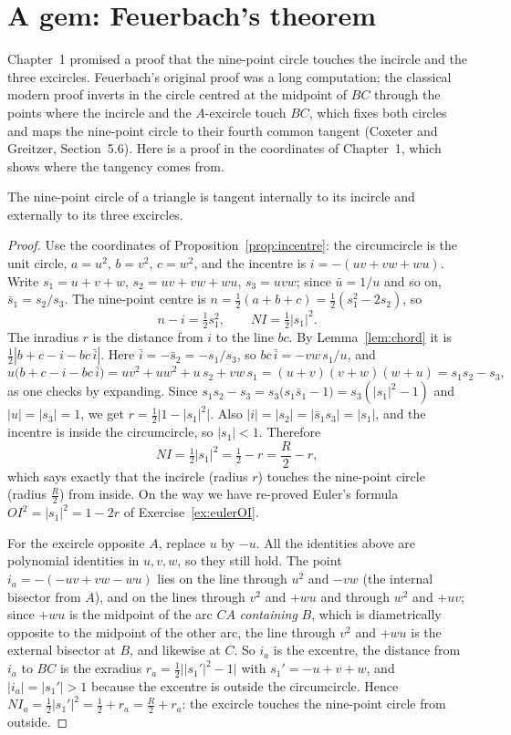 \section{A gem: Feuerbach's theorem}

Chapter~1 promised a proof that the nine-point circle touches the incircle and the three excircles. Feuerbach's original proof was a long
computation; the classical modern proof inverts in the circle centred at the midpoint of $BC$ through the points where the incircle and the
$A$-excircle touch $BC$, which fixes both circles and maps the nine-point circle to their fourth common tangent (Coxeter and Greitzer,
Section~5.6). Here is a proof in the coordinates of Chapter~1, which shows where the tangency comes from.

\begin{theorem}[Feuerbach, 1822]\label{thm:feuerbach}
The nine-point circle of a triangle is tangent internally to its incircle and externally to its three excircles.
\end{theorem}
\begin{proof}
Use the coordinates of Proposition~\ref{prop:incentre}: the circumcircle is the unit circle, $a=u^2$, $b=v^2$, $c=w^2$, and the incentre is
$i=-(uv+vw+wu)$. Write $s_1=u+v+w$, $s_2=uv+vw+wu$, $s_3=uvw$; since $\bar u=1/u$ and so on, $\bar s_1=s_2/s_3$. The nine-point centre is
$n=\frac12(a+b+c)=\frac12(s_1^2-2s_2)$, so
\[
n-i=\tfrac12s_1^2,\qquad NI=\tfrac12|s_1|^2 .
\]
The inradius $r$ is the distance from $i$ to the line $bc$. By Lemma~\ref{lem:chord} it is $\frac12|b+c-i-bc\,\bar i|$. Here
$\bar i=-\bar s_2=-s_1/s_3$, so $bc\,\bar i=-vw\,s_1/u$, and
\[
u\bigl(b+c-i-bc\,\bar i\bigr)=u v^2+uw^2+u\,s_2+vw\,s_1=(u+v)(v+w)(w+u)=s_1s_2-s_3,
\]
as one checks by expanding. Since $s_1s_2-s_3=s_3\bigl(s_1\bar s_1-1\bigr)=s_3(|s_1|^2-1)$ and $|u|=|s_3|=1$, we get $r=\frac12\bigl|1-|s_1|^2\bigr|$.
Also $|i|=|s_2|=|\bar s_1s_3|=|s_1|$, and the incentre is inside the circumcircle, so $|s_1|<1$. Therefore
\[
NI=\tfrac12|s_1|^2=\tfrac12-r=\frac R2-r ,
\]
which says exactly that the incircle (radius $r$) touches the nine-point circle (radius $\frac R2$) from inside. On the way we have re-proved
Euler's formula $OI^2=|s_1|^2=1-2r$ of Exercise~\ref{ex:eulerOI}.

For the excircle opposite $A$, replace $u$ by $-u$. All the identities above are polynomial identities in $u,v,w$, so they still hold. The
point $i_a=-(-uv+vw-wu)$ lies on the line through $u^2$ and $-vw$ (the internal bisector from $A$), and on the lines through $v^2$ and $+wu$ and
through $w^2$ and $+uv$; since $+wu$ is the midpoint of the arc $CA$ \emph{containing} $B$, which is diametrically opposite to the midpoint of
the other arc, the line through $v^2$ and $+wu$ is the external bisector at $B$, and likewise at $C$. So $i_a$ is the excentre, the distance
from $i_a$ to $BC$ is the exradius $r_a=\frac12\bigl||s_1'|^2-1\bigr|$ with $s_1'=-u+v+w$, and $|i_a|=|s_1'|>1$ because the excentre is outside
the circumcircle. Hence $NI_a=\frac12|s_1'|^2=\frac12+r_a=\frac R2+r_a$: the excircle touches the nine-point circle from outside.
\end{proof}

